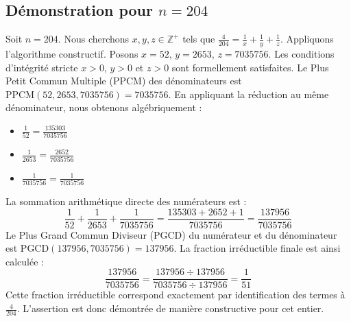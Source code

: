 \documentclass[11pt,a4paper]{article}
\begin{document}
\subsection{Démonstration pour $n = 204$}
Soit $n = 204$. Nous cherchons $x, y, z \in \mathbb{Z}^{+}$ tels que $\frac{4}{204} = \frac{1}{x} + \frac{1}{y} + \frac{1}{z}$.
Appliquons l'algorithme constructif. Posons $x = 52$, $y = 2653$, $z = 7035756$.
Les conditions d'intégrité stricte $x > 0$, $y > 0$ et $z > 0$ sont formellement satisfaites.
Le Plus Petit Commun Multiple (PPCM) des dénominateurs est $\text{PPCM}(52, 2653, 7035756) = 7035756$.
En appliquant la réduction au même dénominateur, nous obtenons algébriquement :
\begin{itemize}
    \item $\frac{1}{52} = \frac{135303}{7035756}$
    \item $\frac{1}{2653} = \frac{2652}{7035756}$
    \item $\frac{1}{7035756} = \frac{1}{7035756}$
\end{itemize}
La sommation arithmétique directe des numérateurs est :
$$ \frac{1}{52} + \frac{1}{2653} + \frac{1}{7035756} = \frac{135303 + 2652 + 1}{7035756} = \frac{137956}{7035756} $$
Le Plus Grand Commun Diviseur (PGCD) du numérateur et du dénominateur est $\text{PGCD}(137956, 7035756) = 137956$.
La fraction irréductible finale est ainsi calculée :
$$ \frac{137956}{7035756} = \frac{137956 \div 137956}{7035756 \div 137956} = \frac{1}{51} $$
Cette fraction irréductible correspond exactement par identification des termes à $\frac{4}{204}$. L'assertion est donc démontrée de manière constructive pour cet entier.
\end{document}
